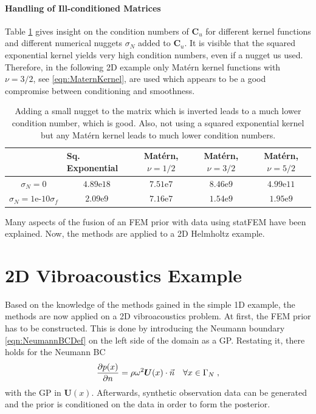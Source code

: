 \documentclass[%
  a4paper,oneside,%
  11pt,%
  smallchapters,
  style=printdev,
  extramargin,
  green,%
  rgb, <cmyk>
  ]{tubsbook}
\begin{document}
\FloatBarrier
\paragraph{Handling of Ill-conditioned Matrices}
Table \ref{tab:Conditioning} gives insight on the condition numbers of $\bm{C}_u$ for different kernel functions and different numerical nuggets $\sigma_N$ added to $\bm{C}_u$. It is visible that the squared exponential kernel yields very high condition numbers, even if a nugget us used. Therefore, in the following 2D example only Mat\'ern kernel functions with $\nu=3/2$, see \eqref{eqn:MaternKernel}, are used which appears to be a good compromise between conditioning and smoothness.
\begin{table}[!ht]
\centering
\caption{Adding a small nugget to the matrix which is inverted leads to a much lower condition number, which is good. Also, not using a squared exponential kernel but any Mat\'ern kernel leads to much lower condition numbers.}
\label{tab:Conditioning}
\begin{tabular}{@{}ccccc@{}}
\toprule
                                  & \multicolumn{1}{l}{Sq. Exponential} & Mat\'ern, $\nu = 1/2$ & Mat\'ern, $\nu = 3/2$ & Mat\'ern, $\nu = 5/2$ \\ \midrule
$\sigma_N = 0$                    & $4.89\text{e}18$                        & $7.51\text{e}7$                       & $8.46\text{e}9$                       & $4.99\text{e}11$                      \\
$\sigma_N = 1\text{e-}10\sigma_f$ & $2.09\text{e}9$                         & $7.16\text{e}7$                       & $1.54\text{e}9$                       & $1.95\text{e}9$                       \\ \bottomrule
\end{tabular}
\end{table}
\FloatBarrier

Many aspects of the fusion of an FEM prior with data using statFEM have been explained. Now, the methods are applied to a 2D Helmholtz example.


\section{2D Vibroacoustics Example}
Based on the knowledge of the methods gained in the simple 1D example, the methods are now applied on a 2D vibroacoustics problem. At first, the FEM prior has to be constructed. This is done by introducing the Neumann boundary \eqref{eqn:NeumannBCDef} on the left side of the domain as a GP. Restating it, there holds for the Neumann BC
\begin{equation}
\pdv{p(x)}{n} = \rho \omega^2 \bm{U}(x) \cdot \vec{n} \quad \forall x \in \Gamma_N \;,
\end{equation}
with the GP in $\bm{U}(x)$.
Afterwards, synthetic observation data can be generated and the prior is conditioned on the data in order to form the posterior.
\end{document}
